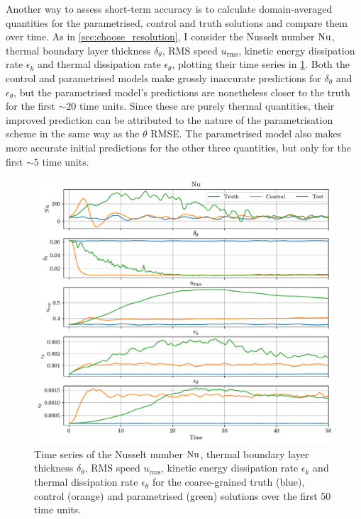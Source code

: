 \documentclass[../main.tex]{subfiles}
\begin{document}
Another way to assess short-term accuracy is to calculate domain-averaged
quantities for the parametrised, control and truth solutions and compare them
over time. As in \cref{sec:choose_resolution}, I consider the Nusselt number
$\mathrm{Nu}$, thermal boundary layer thickness $\delta_\theta$, RMS speed
$u_\mathrm{rms}$, kinetic energy dissipation rate $\epsilon_k$ and thermal
dissipation rate $\epsilon_\theta$, plotting their time series in
\cref{fig:short_term_metrics}. Both the control and parametrised models make
grossly inaccurate predictions for $\delta_\theta$ and $\epsilon_\theta$, but
the parametrised model's predictions are nonetheless closer to the truth for
the first $\sim 20$ time units. Since these are purely thermal quantities,
their improved prediction can be attributed to the nature of the
parametrisation scheme in the same way as the $\theta$ RMSE. The parametrised
model also makes more accurate initial predictions for the other three
quantities, but only for the first $\sim 5$ time units.

\begin{figure}[ht]
    \centering
    \includegraphics[width=\linewidth]{figures/short_term_metrics.pdf}
    \caption{
        Time series of the Nusselt number $\mathrm{Nu}$, thermal boundary layer
        thickness $\delta_\theta$, RMS speed $u_\mathrm{rms}$, kinetic energy
        dissipation rate $\epsilon_k$ and thermal dissipation rate
        $\epsilon_\theta$ for the coarse-grained truth (blue), control (orange)
        and parametrised (green) solutions over the first 50 time units.
    }
    \label{fig:short_term_metrics}
\end{figure}
\end{document}
